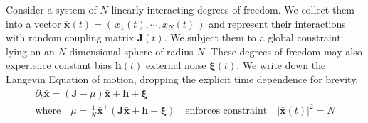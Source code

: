 
Consider a system of $N$ linearly interacting degrees of freedom. We collect them into a vector $\mathbf{\bar x}(t) = \left(\,x_1(t),\cdots, x_N(t)\,\right)$ and represent their interactions with random coupling matrix $\mathbf{J}(t)$. We subject them to a global constraint: lying on an $N$-dimensional sphere of radius $N$. These degrees of freedom may also experience constant bias $\mathbf{h}(t)$ external noise $\boldsymbol\xi(t)$. We write down the Langevin Equation of motion, dropping the explicit time dependence for brevity.
\begin{gather}
\partial_t\mathbf{\bar x} = (\mathbf{J}-\mu)\mathbf{\bar x}+\mathbf{h}+\boldsymbol\xi\quad\\
\text{where}\quad\mu = \frac{1}{N}\mathbf{\bar x}^{\top}\left(\mathbf{J}\mathbf{\bar x}+\mathbf{h}+\boldsymbol\xi\right)\quad\text{enforces constraint}\quad|\mathbf{\bar x}(t)|^2=N
\end{gather}